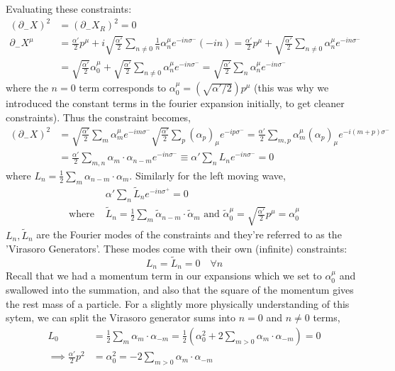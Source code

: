 \documentclass{article}
\begin{document}
Evaluating these constraints:
\begin{align}
	(\partial_-X)^2 &= (\partial_-X_R)^2 = 0\\
	\partial_-X^\mu &= \frac{\alpha'}{2}p^\mu +i\sqrt{\frac{\alpha'}{2}}\sum_{n\neq0}\frac{1}{n}\alpha_n^\mu e^{-in\sigma^-}(-in)=\frac{\alpha'}{2}p^\mu +\sqrt{\frac{\alpha'}{2}}\sum_{n\neq0}\alpha_n^\mu e^{-in\sigma^-}\\
					&=\sqrt{\frac{\alpha'}{2}}\alpha_0^\mu +\sqrt{\frac{\alpha'}{2}}\sum_{n\neq0}\alpha_n^\mu e^{-in\sigma^-} = \sqrt{\frac{\alpha'}{2}}\sum_{n}\alpha_n^\mu e^{-in\sigma^-}\label{eq:dminusX}
\end{align}
where the $n=0$ term corresponds to $\alpha_0^\mu = (\sqrt{\alpha'/2})p^\mu$ (this was why we introduced the constant terms in the fourier expansion initially, to get cleaner constraints). Thus the constraint becomes,
\begin{align}
	(\partial_-X)^2 &= \sqrt{\frac{\alpha'}{2}}\sum_{m}\alpha_m^\mu e^{-im\sigma^-}\sqrt{\frac{\alpha'}{2}}\sum_{p}(\alpha_p)_\mu e^{-ip\sigma^-}=\frac{\alpha'}{2}\sum_{m,p}\alpha_m^\mu (\alpha_p)_\mu e^{-i(m+p)\sigma^-}\\
	&=\frac{\alpha'}{2}\sum_{m,n}\alpha_m\cdot\alpha_{n-m}e^{-in\sigma^-}\equiv \alpha'\sum_n L_n e^{-in\sigma^-}=0
\end{align}
where $L_n = \frac{1}{2}\sum_m\alpha_{n-m}\cdot\alpha_m$. Similarly for the left moving wave,
\begin{align}
	&\alpha'\sum_n \tilde{L}_n e^{-in\sigma^+}=0\\
	\text{where } &\tilde{L}_n=\frac{1}{2}\sum_m \tilde{\alpha}_{n-m}\cdot \tilde{\alpha}_m \text{ and } \tilde{\alpha}_0^\mu = \sqrt{\frac{\alpha'}{2}}p^\mu = \alpha_0^\mu
\end{align}
$L_n, \tilde{L}_n$ are the Fourier modes of the constraints and they're referred to as the 'Virasoro Generators'. These modes come with their own (infinite) constraints:
\begin{equation}
	L_n=\tilde{L}_n=0 \quad\forall n 
\end{equation}
Recall that we had a momentum term in our expansions which we set to $\alpha_0^\mu$ and swallowed into the summation, and also that the square of the momentum gives the rest mass of a particle. For a slightly more physically understanding of this sytem, we can split the Virasoro generator sums into $n=0$ and $n\neq0$ terms,
\begin{align}
	L_0 &= \frac{1}{2}\sum_m\alpha_m\cdot\alpha_{-m} = \frac{1}{2}(\alpha_0^2+2\sum_{m>0}\alpha_m\cdot\alpha_{-m})=0\\
	\implies \frac{\alpha'}{2}p^2&=\alpha_0^2=-2\sum_{m>0}\alpha_m\cdot\alpha_{-m}
\end{align}
\end{document}

